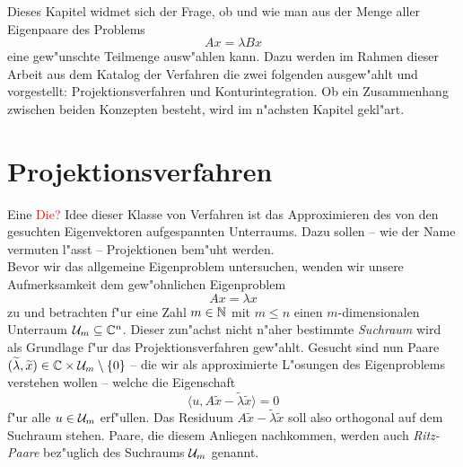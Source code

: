 Dieses Kapitel widmet sich der Frage, ob und wie man aus der Menge aller Eigenpaare
des Problems
\[
Ax = \lambda Bx
\]
eine gew"unschte Teilmenge ausw"ahlen kann. Dazu werden im Rahmen dieser Arbeit aus dem Katalog der Verfahren
die zwei folgenden ausgew"ahlt und vorgestellt: Projektionsverfahren und Konturintegration.
Ob ein Zusammenhang zwischen beiden Konzepten besteht, wird im n"achsten Kapitel gekl"art.\\


\section{Projektionsverfahren}
Eine \textcolor{red}{Die?} Idee dieser Klasse von Verfahren ist das Approximieren des von
den gesuchten Eigenvektoren aufgespannten Unterraums. Dazu sollen -- wie der Name vermuten l"asst --
Projektionen bem"uht werden.\\

Bevor wir das allgemeine Eigenproblem untersuchen, wenden wir unsere Aufmerksamkeit
dem gew"ohnlichen Eigenproblem
\[
Ax = \lambda x%
\]
zu und betrachten f"ur eine Zahl $m\in\mathbb{N}$ mit $m\le n$
einen $m$-dimensionalen Unterraum $\mathcal{U}_m\subseteq\mathbb{C}^n$. Dieser zun"achst nicht
n"aher bestimmte \emph{Suchraum} wird als Grundlage f"ur das Projektionsverfahren gew"ahlt.
Gesucht sind nun Paare $(\widetilde{\lambda}, \widetilde{x})\in\mathbb{C}\times \mathcal{U}_m \setminus\{0\}$ --
die wir als approximierte L"osungen des Eigenproblems verstehen wollen --
welche die Eigenschaft
\begin{equation}\label{eq:orthogonal}
\langle u, A\widetilde{x} - \widetilde{\lambda}\widetilde{x} \rangle=0
\end{equation}
f"ur alle $u \in \mathcal{U}_m $ erf"ullen. Das Residuum $A\widetilde{x} - \widetilde{\lambda}\widetilde{x}$
soll also orthogonal auf dem Suchraum stehen. Paare, die diesem Anliegen nachkommen,
werden auch \emph{Ritz-Paare} bez"uglich des Suchraums $\mathcal{U}_m$ genannt.\\

